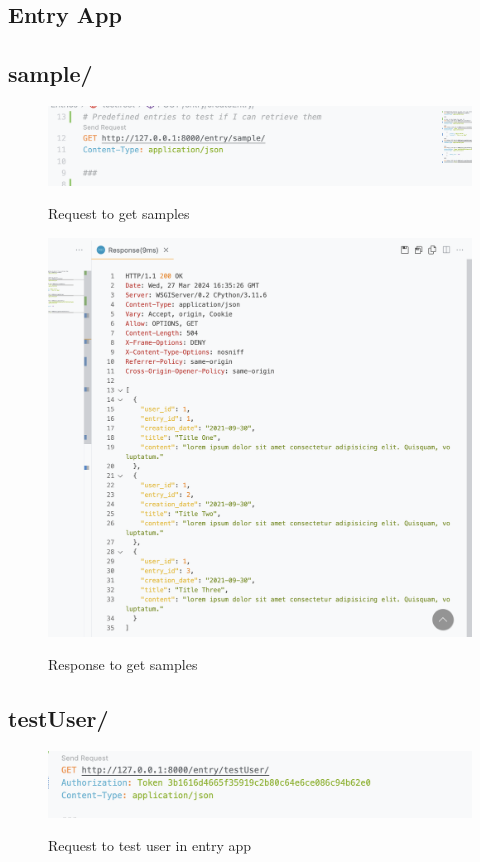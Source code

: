 \subsection{Entry App}

\subsection{sample/}
\begin{figure}[H]
    \caption{Request to get samples}
    \includegraphics[width=\textwidth]{Assets/api_test/request_get_samples.png}
    \label{fig:request_get_samples}
\end{figure}

\begin{figure}[H]
    \caption{Response to get samples}
    \includegraphics[width=\textwidth]{Assets/api_test/response_get_samples.png}
    \label{fig:response_get_samples}
\end{figure}

\subsection{testUser/}
\begin{figure}[H]
    \caption{Request to test user in entry app}
    \includegraphics[width=\textwidth]{Assets/api_test/request_test_user_entry.png}
    \label{fig:request_test_user_entry}
\end{figure}

